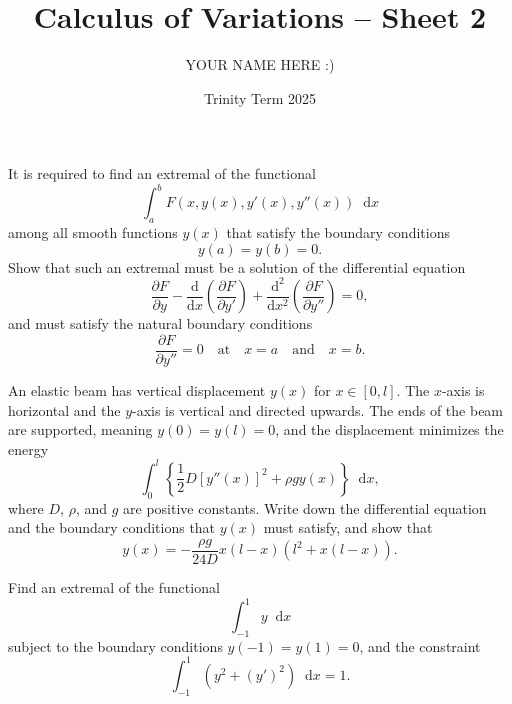 \documentclass[answers]{exam}
\title{Calculus of Variations -- Sheet 2}
\author{YOUR NAME HERE :)}
\date{Trinity Term 2025}
\renewcommand*{\dd}{\mathop{}\!\mathrm d} %
\renewcommand*{\dv}[2]{\frac{\mathrm d#1}{\mathrm d#2}} %
\renewcommand*{\pdv}[2]{\frac{\partial #1}{\partial #2}} %
\begin{document}
\maketitle
\begin{questions}

\question%
It is required to find an extremal of the functional \[
	\int_a^b F(x, y(x), y'(x), y''(x)) \dd x
\] among all smooth functions $y(x)$ that satisfy the boundary conditions \[
	y(a)=y(b)=0 .
\] Show that such an extremal must be a solution of the differential equation \[
	\pdv Fy-\dv{}x\left(\pdv F{y'}\right)+\dv{^2}{x^2}\left(\pdv F{y''}\right)=0,
\] and must satisfy the natural boundary conditions \[
	\pdv F{y''}=0 \quad
	\text{at} \quad
	x=a \quad
	\text{and} \quad
	x=b.
\]



\question%
An elastic beam has vertical displacement $y(x)$ for $x \in[0, l]$. The $x$-axis is horizontal and the $y$-axis is vertical and directed upwards. The ends of the beam are supported, meaning $y(0)=y(l)=0$, and the displacement minimizes the energy \[
	\int_0^l\left\{\frac12 D[y''(x)]^2+\rho g y(x)\right\} \dd x,
\] where $D$, $\rho$, and $g$ are positive constants. Write down the differential equation and the boundary conditions that $y(x)$ must satisfy, and show that \[
	y(x)=-\frac{\rho g}{24 D} x(l-x)(l^2+x(l-x)) .
\]



\question%
Find an extremal of the functional \[
	\int_{-1}^1 y \dd x
\] subject to the boundary conditions $y(-1)=y(1)=0$, and the constraint \[
	\int_{-1}^1(y^2+(y')^2) \dd x=1 .
\]



\question%




\end{questions}
\end{document}
